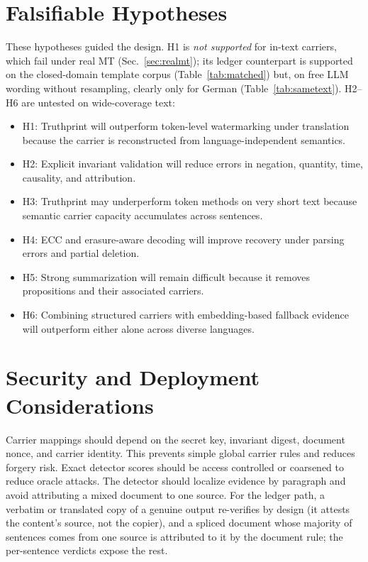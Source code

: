 \documentclass[journal]{IEEEtran}
\begin{document}
\section{Falsifiable Hypotheses}
These hypotheses guided the design. H1 is \emph{not supported} for in-text carriers, which fail under real MT (Sec.~\ref{sec:realmt}); its ledger counterpart is supported on the closed-domain template corpus (Table~\ref{tab:matched}) but, on free LLM wording without resampling, clearly only for German (Table~\ref{tab:sametext}). H2--H6 are untested on wide-coverage text:
\begin{itemize}[leftmargin=*]
  \item H1: Truthprint will outperform token-level watermarking under translation because the carrier is reconstructed from language-independent semantics.
  \item H2: Explicit invariant validation will reduce errors in negation, quantity, time, causality, and attribution.
  \item H3: Truthprint may underperform token methods on very short text because semantic carrier capacity accumulates across sentences.
  \item H4: ECC and erasure-aware decoding will improve recovery under parsing errors and partial deletion.
  \item H5: Strong summarization will remain difficult because it removes propositions and their associated carriers.
  \item H6: Combining structured carriers with embedding-based fallback evidence will outperform either alone across diverse languages.
\end{itemize}

\section{Security and Deployment Considerations}
Carrier mappings should depend on the secret key, invariant digest, document nonce, and carrier identity. This prevents simple global carrier rules and reduces forgery risk. Exact detector scores should be access controlled or coarsened to reduce oracle attacks. The detector should localize evidence by paragraph and avoid attributing a mixed document to one source. For the ledger path, a verbatim or translated copy of a genuine output re-verifies by design (it attests the content's source, not the copier), and a spliced document whose majority of sentences comes from one source is attributed to it by the document rule; the per-sentence verdicts expose the rest.
\end{document}
